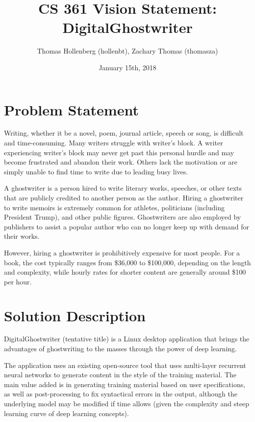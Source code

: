 \documentclass[12pt]{article}
\title{CS 361 Vision Statement: \\ DigitalGhostwriter}
\author{Thomas Hollenberg (hollenbt), Zachary Thomas (thomasza)}
\date{January 15th, 2018}
\begin{document}
\maketitle
\tableofcontents


\newpage

\section{Problem Statement}

Writing, whether it be a novel, poem, journal article, speech or song, is difficult and time-consuming. Many writers struggle with writer's block. A writer experiencing writer's block may never get past this personal hurdle and may become frustrated and abandon their work. Others lack the motivation or are simply unable to find time to write due to leading busy lives.\cite{WritingChallenges}

A ghostwriter is a person hired to write literary works, speeches, or other texts that are publicly credited to another person as the author. Hiring a ghostwriter to write memoirs is extremely common for athletes, politicians (including President Trump), and other public figures. Ghostwriters are also employed by publishers to assist a popular author who can no longer keep up with demand for their works.\cite{HardyBoysInvisibleAuthors}

However, hiring a ghostwriter is prohibitively expensive for most people. For a book, the cost typically ranges from \$36,000 to \$100,000, depending on the length and complexity, while hourly rates for shorter content are generally around \$100 per hour.\cite{HiringGhostwriter}

\section{Solution Description}

DigitalGhostwriter (tentative title) is a Linux desktop application that brings the advantages of ghostwriting to the masses through the power of deep learning.

The application uses an existing open-source tool that uses multi-layer recurrent neural networks to generate content in the style of the training material. The main value added is in generating training material based on user specifications, as well as post-processing to fix syntactical errors in the output, although the underlying model may be modified if time allows (given the complexity and steep learning curve of deep learning concepts).
\end{document}
